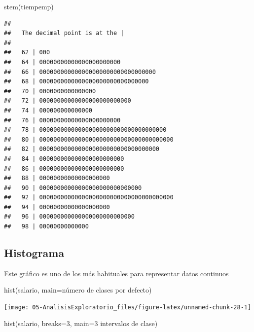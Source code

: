 \documentclass[
]{book}
\newenvironment{Shaded}{\begin{snugshade}}{\end{snugshade}}
\newcommand{\AttributeTok}[1]{\textcolor[rgb]{0.77,0.63,0.00}{#1}}
\newcommand{\DecValTok}[1]{\textcolor[rgb]{0.00,0.00,0.81}{#1}}
\newcommand{\FunctionTok}[1]{\textcolor[rgb]{0.00,0.00,0.00}{#1}}
\newcommand{\NormalTok}[1]{#1}
\newcommand{\StringTok}[1]{\textcolor[rgb]{0.31,0.60,0.02}{#1}}
\theoremstyle{break}
\begin{document}
\begin{Shaded}
\begin{Highlighting}[]
\FunctionTok{stem}\NormalTok{(tiempemp)}
\end{Highlighting}
\end{Shaded}

\begin{verbatim}
## 
##   The decimal point is at the |
## 
##   62 | 000
##   64 | 00000000000000000000000
##   66 | 000000000000000000000000000000000
##   68 | 0000000000000000000000000000000
##   70 | 0000000000000000
##   72 | 00000000000000000000000000
##   74 | 000000000000000
##   76 | 00000000000000000000000
##   78 | 000000000000000000000000000000000000
##   80 | 00000000000000000000000000000000000000
##   82 | 0000000000000000000000000000000000
##   84 | 000000000000000000000000
##   86 | 000000000000000000000000
##   88 | 00000000000000000000
##   90 | 00000000000000000000000000000
##   92 | 00000000000000000000000000000000000000
##   94 | 00000000000000000000
##   96 | 000000000000000000000000000
##   98 | 00000000000000
\end{verbatim}

\hypertarget{histograma}{%
\subsection{Histograma}\label{histograma}}

Este gráfico es uno de los más habituales para representar datos continuos

\begin{Shaded}
\begin{Highlighting}[]
\FunctionTok{hist}\NormalTok{(salario, }\AttributeTok{main=}\StringTok{\textquotesingle{}número de clases por defecto\textquotesingle{}}\NormalTok{)}
\end{Highlighting}
\end{Shaded}

\begin{center}\texttt{[image: 05-AnalisisExploratorio\_files/figure-latex/unnamed-chunk-28-1]} \end{center}

\begin{Shaded}
\begin{Highlighting}[]
\FunctionTok{hist}\NormalTok{(salario, }\AttributeTok{breaks=}\DecValTok{3}\NormalTok{, }\AttributeTok{main=}\StringTok{\textquotesingle{}3 intervalos de clase\textquotesingle{}}\NormalTok{)}
\end{Highlighting}
\end{Shaded}
\end{document}
